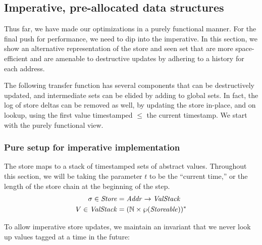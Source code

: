 \documentclass[9pt]{sigplanconf} %
\begin{document}

\subsection{Imperative, pre-allocated data structures}

Thus far, we have made our optimizations in a purely functional manner.
%
For the final push for performance, we need to dip into the imperative.
%
In this section, we show an alternative representation of the store and seen set that are more space-efficient and are amenable to destructive updates by adhering to a history for each address.

The following transfer function has several components that can be destructively updated, and intermediate sets can be elided by adding to global sets.
%
In fact, the log of store deltas can be removed as well, by updating the store in-place, and on lookup, using the first value timestamped $\le$ the current timestamp.
%
We start with the purely functional view.

\subsubsection{Pure setup for imperative implementation}

The store maps to a stack of timestamped sets of abstract values.
%
Throughout this section, we will be taking the parameter $t$ to be the ``current time,'' or the length of the store chain at the beginning of the step.
\vspace{-0.9em}
\begin{align*}
\sigma \in \mathit{Store} &= \mathit{Addr} \to \mathit{ValStack} \\
V \in \mathit{ValStack} &= ({\mathbb N} \times \wp(\mathit{Storeable}))^*
\end{align*}

To allow imperative store updates, we maintain an invariant that we never look up values tagged at a time in the future:
\end{document}

